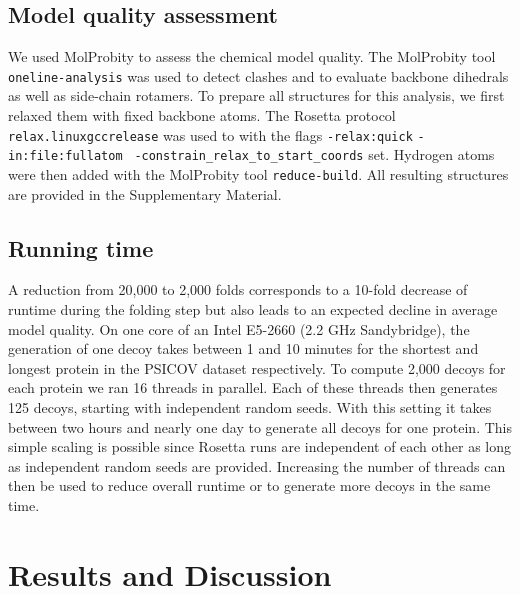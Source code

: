 \documentclass{bioinfo}
\begin{document}
\begin{methods}
\subsection{Model quality assessment}

We used MolProbity \cite[]{chen_molprobity:_2010} to assess the chemical
model quality. The MolProbity tool {\tt oneline-analysis} was used to 
detect clashes and to evaluate backbone dihedrals as well as 
side-chain rotamers. To prepare all structures for this analysis, we 
first relaxed them with fixed backbone atoms.
The Rosetta protocol {\tt relax.linuxgccrelease} was used to with the flags 
{\tt -relax:quick} {\tt -in:file:fullatom} {\tt 
-constrain\_relax\_to\_start\_coords} set. Hydrogen atoms were then 
added with the MolProbity tool {\tt reduce-build}. All resulting 
structures are provided in the Supplementary Material.



\subsection{Running time}
A reduction from 20,000 to 2,000 folds corresponds to a 10-fold
decrease of runtime during the folding step but also leads to an
expected decline in average model quality. On one core of an Intel
E5-2660 (2.2 GHz Sandybridge), the generation of one decoy takes
between 1 and 10 minutes for the shortest and longest protein in the
PSICOV dataset respectively. To compute 2,000 decoys for each protein
we ran 16 threads in parallel. Each of these threads then generates
125 decoys, starting with independent random seeds. With this setting
it takes between two hours and nearly one day to generate all decoys
for one protein. This simple scaling is possible since Rosetta runs
are independent of each other as long as independent random seeds are
provided. Increasing the number of threads can then be used to reduce
overall runtime or to generate more decoys in the same time.

\end{methods}


\section{Results and Discussion}
\end{document}
